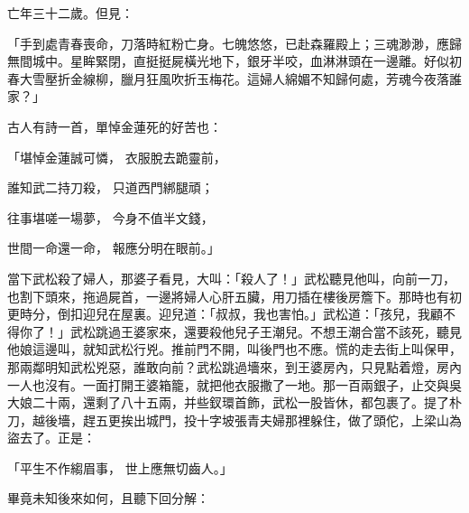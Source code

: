 \begin{showcontents}{}
亡年三十二歲。但見：

「手到處青春喪命，刀落時紅粉亡身。七魄悠悠，已赴森羅殿上；三魂渺渺，應歸無間城中。星眸緊閉，直挺挺屍橫光地下，銀牙半咬，血淋淋頭在一邊離。好似初春大雪壓折金線柳，臘月狂風吹折玉梅花。這婦人綿媚不知歸何處，芳魂今夜落誰家？」

古人有詩一首，單悼金蓮死的好苦也：

「堪悼金蓮誠可憐，  衣服脫去跪靈前，

誰知武二持刀殺，  只道西門綁腿頑；

往事堪嗟一場夢，  今身不值半文錢，

世間一命還一命，  報應分明在眼前。」

當下武松殺了婦人，那婆子看見，大叫：「殺人了！」武松聽見他叫，向前一刀，也割下頭來，拖過屍首，一邊將婦人心肝五臟，用刀插在樓後房簷下。那時也有初更時分，倒扣迎兒在屋裏。迎兒道：「叔叔，我也害怕。」武松道：「孩兒，我顧不得你了！」武松跳過王婆家來，還要殺他兒子王潮兒。不想王潮合當不該死，聽見他娘這邊叫，就知武松行兇。推前門不開，叫後門也不應。慌的走去街上叫保甲，那兩鄰明知武松兇惡，誰敢向前？武松跳過墻來，到王婆房內，只見點着燈，房內一人也沒有。一面打開王婆箱籠，就把他衣服撒了一地。那一百兩銀子，止交與吳大娘二十兩，還剩了八十五兩，并些釵環首飾，武松一股皆休，都包裹了。提了朴刀，越後墻，趕五更挨出城門，投十字坡張青夫婦那裡躲住，做了頭佗，上梁山為盜去了。正是：

「平生不作縐眉事，  世上應無切齒人。」

畢竟未知後來如何，且聽下回分解：





\end{showcontents}


